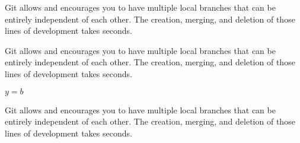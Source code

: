 Git allows and encourages you to have multiple local branches that can be entirely independent of each other. The creation, merging, and deletion of those lines of development takes seconds.


Git allows and encourages you to have multiple local branches that can be entirely independent of each other. The creation, merging, and deletion of those lines of development takes seconds.

$y=b$

Git allows and encourages you to have multiple local branches that can be entirely independent of each other. The creation, merging, and deletion of those lines of development takes seconds.
